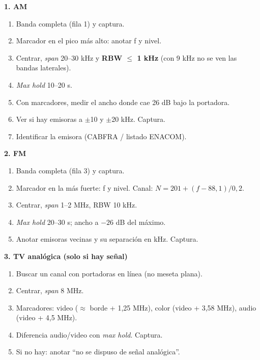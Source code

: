 \documentclass[10pt]{article}
\begin{document}
\vspace{3pt}
\begin{minipage}[t]{0.49\textwidth}
\textbf{1. AM}
\begin{enumerate}
    \item Banda completa (fila 1) y captura.
    \item Marcador en el pico más alto: anotar f y nivel.
    \item Centrar, \textit{span} 20--30 kHz y \textbf{RBW $\leq$ 1 kHz} (con 9 kHz no se ven las bandas laterales).
    \item \textit{Max hold} 10--20 s.
    \item Con marcadores, medir el ancho donde cae 26 dB bajo la portadora.
    \item Ver si hay emisoras a $\pm$10 y $\pm$20 kHz. Captura.
    \item Identificar la emisora (CABFRA / listado ENACOM).
\end{enumerate}

\vspace{4pt}
\textbf{2. FM}
\begin{enumerate}
    \item Banda completa (fila 3) y captura.
    \item Marcador en la más fuerte: f y nivel. Canal: $N = 201 + (f - 88{,}1)/0{,}2$.
    \item Centrar, \textit{span} 1--2 MHz, RBW 10 kHz.
    \item \textit{Max hold} 20--30 s; ancho a $-26$ dB del máximo.
    \item Anotar emisoras vecinas y su separación en kHz. Captura.
\end{enumerate}

\vspace{4pt}
\textbf{3. TV analógica (solo si hay señal)}
\begin{enumerate}
    \item Buscar un canal con portadoras en línea (no meseta plana).
    \item Centrar, \textit{span} 8 MHz.
    \item Marcadores: video ($\approx$ borde + 1,25 MHz), color (video + 3,58 MHz), audio (video + 4,5 MHz).
    \item Diferencia audio/video con \textit{max hold}. Captura.
    \item Si no hay: anotar ``no se dispuso de señal analógica''.
\end{enumerate}
\end{minipage}\hfill
\end{document}
